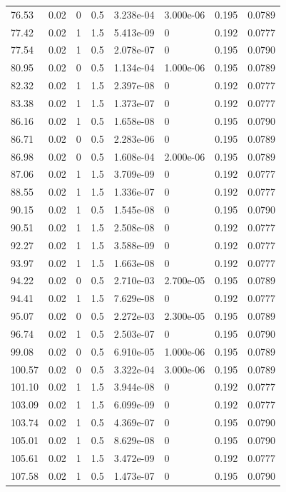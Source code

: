 \documentclass[preview]{standalone}
\begin{document}
{{{\begin{tabular}{L{1.2cm}C{1.2cm} C{0.3cm}C{0.5cm} C{1.4cm}C{1.4cm} C{1.4cm}C{1.4cm}}
  76.53  &  0.02  & 0     & 0.5 &  3.238e-04  & 3.000e-06  & 0.195 &  0.0789   \\ 
  77.42  &  0.02  & 1     & 1.5 &  5.413e-09  & 0  & 0.192 &  0.0777   \\ 
  77.54  &  0.02  & 1     & 0.5 &  2.078e-07  & 0  & 0.195 &  0.0790   \\ 
  80.95  &  0.02  & 0     & 0.5 &  1.134e-04  & 1.000e-06  & 0.195 &  0.0789   \\ 
  82.32  &  0.02  & 1     & 1.5 &  2.397e-08  & 0  & 0.192 &  0.0777   \\ 
  83.38  &  0.02  & 1     & 1.5 &  1.373e-07  & 0  & 0.192 &  0.0777   \\ 
  86.16  &  0.02  & 1     & 0.5 &  1.658e-08  & 0  & 0.195 &  0.0790   \\ 
  86.71  &  0.02  & 0     & 0.5 &  2.283e-06  & 0  & 0.195 &  0.0789   \\ 
  86.98  &  0.02  & 0     & 0.5 &  1.608e-04  & 2.000e-06  & 0.195 &  0.0789   \\ 
  87.06  &  0.02  & 1     & 1.5 &  3.709e-09  & 0  & 0.192 &  0.0777   \\ 
  88.55  &  0.02  & 1     & 1.5 &  1.336e-07  & 0  & 0.192 &  0.0777   \\ 
  90.15  &  0.02  & 1     & 0.5 &  1.545e-08  & 0  & 0.195 &  0.0790   \\ 
  90.51  &  0.02  & 1     & 1.5 &  2.508e-08  & 0  & 0.192 &  0.0777   \\ 
  92.27  &  0.02  & 1     & 1.5 &  3.588e-09  & 0  & 0.192 &  0.0777   \\ 
  93.97  &  0.02  & 1     & 1.5 &  1.663e-08  & 0  & 0.192 &  0.0777   \\ 
  94.22  &  0.02  & 0     & 0.5 &  2.710e-03  & 2.700e-05  & 0.195 &  0.0789   \\ 
  94.41  &  0.02  & 1     & 1.5 &  7.629e-08  & 0  & 0.192 &  0.0777   \\ 
  95.07  &  0.02  & 0     & 0.5 &  2.272e-03  & 2.300e-05  & 0.195 &  0.0789   \\ 
  96.74  &  0.02  & 1     & 0.5 &  2.503e-07  & 0  & 0.195 &  0.0790   \\ 
  99.08  &  0.02  & 0     & 0.5 &  6.910e-05  & 1.000e-06  & 0.195 &  0.0789   \\ 
  100.57  &  0.02  & 0     & 0.5 &  3.322e-04  & 3.000e-06  & 0.195 &  0.0789   \\ 
  101.10  &  0.02  & 1     & 1.5 &  3.944e-08  & 0  & 0.192 &  0.0777   \\ 
  103.09  &  0.02  & 1     & 1.5 &  6.099e-09  & 0  & 0.192 &  0.0777   \\ 
  103.74  &  0.02  & 1     & 0.5 &  4.369e-07  & 0  & 0.195 &  0.0790   \\ 
  105.01  &  0.02  & 1     & 0.5 &  8.629e-08  & 0  & 0.195 &  0.0790   \\ 
  105.61  &  0.02  & 1     & 1.5 &  3.472e-09  & 0  & 0.192 &  0.0777   \\ 
  107.58  &  0.02  & 1     & 0.5 &  1.473e-07  & 0  & 0.195 &  0.0790   \\ 
\hline 
\end{tabular} 

}}}
\end{document}
